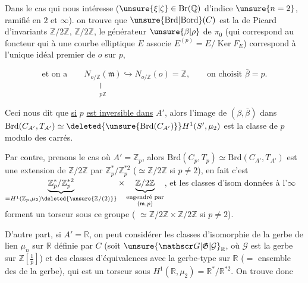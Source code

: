
Dans le cas qui nous intéresse ($\unsure{\xi|\zeta}\in\mathrm{Br}(\mathbb Q)$
d'indice $\unsure{n=2}$, ramifié  en $2$ et $\infty$). 
on trouve que $\unsure{\mathrm{Brd}|\mathrm{Bord}}(C)$ est la  de Picard
 d'invariants $\mathbb Z/2\mathbb Z$, $\mathbb Z/2\mathbb Z$, le générateur
$\unsure{\beta|\rho}$ de $\pi_0$ (qui correspond au  foncteur
qui à une courbe elliptique $E$ associe $E^{(p)}=E/\operatorname{Ker} F_E$)
correspond à l'unique idéal premier  de $o$ sur $p$,

\[
\text{et on a}\qquad \underset{\substack{\Vert\\p\mathbb Z}}{N_{o/\mathbb Z}(\mathfrak m)}
\hookrightarrow N_{o/\mathbb Z}(o)=\mathbb Z,\qquad \text{on choisit }\bar\beta=p.
\]

Ceci nous dit que \uline{si} $p$ \uline{est inversible dans} $A'$, alors
l'image de $(\beta,\bar\beta)$ dans $\mathrm{Brd}(C_{A'},T_{A'})\simeq\deleted{\unsure{\mathrm{Brd}(C_{A'})}}H^1(S',\mu_2)$
est la classe de $p$ modulo des carrés.

Par contre, prenons le cas où $A'=\mathbb Z_p$, alors
$\mathrm{Brd}(C_p,T_p)\simeq\mathrm{Brd}(C_{A'},T_{A'})$ est une extension de $\mathbb Z/2\mathbb Z$ par
$\mathbb Z_p^*/\mathbb Z_p^{*2}$ ($\simeq\mathbb Z/2\mathbb Z$ si $p\ne2$), en fait c'est
$\underbrace{\mathbb Z_p^*/\mathbb Z_p^{*2}}_{=H^1(\mathbb Z_p,\mu_2)\deleted{\unsure{\mathbb Z/(2)}}}\times
\underbrace{\mathbb Z/2\mathbb Z}_{\substack{\text{engendré par}\\(\mathfrak m,p)}}$, et les
classes d'isom  données à l'$\infty$  forment un torseur
sous ce groupe ( $\simeq\mathbb Z/2\mathbb Z\times\mathbb Z/2\mathbb Z$ si $p\ne2$).

D'autre part, si $A'=\mathbb R$, on peut considérer les classes d'isomorphie de la gerbe de lien $\mu_n$ sur $\mathbb R$ définie par $C$
(soit $\unsure{\mathscr G|\mathfrak G|\mathcal G}_{\mathbb R}$, où $\mathscr G$ est la gerbe sur $\mathbb Z[\frac1p]$) et  des
classes d'équivalences avec la gerbe-type sur $\mathbb R$
($=$ ensemble des \uline{} de la gerbe), qui est un
torseur sous $H^1(\mathbb R,\mu_2)=\mathbb R^*/\mathbb R^{*2}$. On trouve donc

